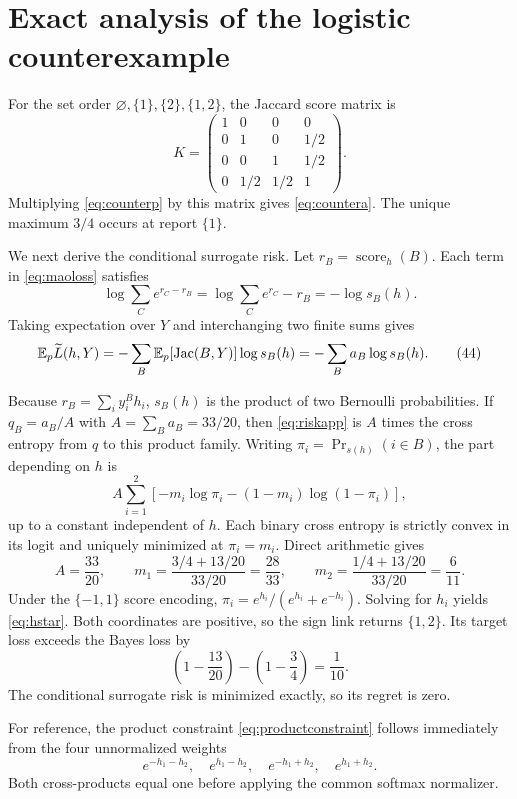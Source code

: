 \section{Exact analysis of the logistic counterexample}
\label{app:counterexample}

For the set order
$\varnothing,\{1\},\{2\},\{1,2\}$, the Jaccard score matrix is
\[
 K=
 \begin{pmatrix}
 1&0&0&0\\
 0&1&0&1/2\\
 0&0&1&1/2\\
 0&1/2&1/2&1
 \end{pmatrix}.
 \tag{42}\label{eq:Ktwo}
\]
Multiplying \eqref{eq:counterp} by this matrix gives
\eqref{eq:countera}. The unique maximum $3/4$ occurs at report $\{1\}$.

We next derive the conditional surrogate risk. Let
$r_B=\operatorname{score}_h(B)$. Each term in \eqref{eq:maoloss} satisfies
\[
 \log\sum_Ce^{r_C-r_B}
 =\log\sum_Ce^{r_C}-r_B=-\log s_B(h).
 \tag{43}\label{eq:logsoftmaxapp}
\]
Taking expectation over $Y$ and interchanging two finite sums gives
\[
 \mathbb E_p\widetilde L(h,Y)
 =-\sum_B\mathbb E_p[\operatorname{Jac}(B,Y)]\log s_B(h)
 =-\sum_Ba_B\log s_B(h).
 \tag{44}\label{eq:riskapp}
\]

Because $r_B=\sum_i y_i^Bh_i$, $s_B(h)$ is the product of two Bernoulli
probabilities. If $q_B=a_B/A$ with $A=\sum_Ba_B=33/20$, then
\eqref{eq:riskapp} is $A$ times the cross entropy from $q$ to this product
family. Writing $\pi_i=\Pr_{s(h)}(i\in B)$, the part depending on $h$ is
\[
 A\sum_{i=1}^2[-m_i\log\pi_i-(1-m_i)\log(1-\pi_i)],
 \tag{45}\label{eq:binaryce}
\]
up to a constant independent of $h$. Each binary cross entropy is strictly
convex in its logit and uniquely minimized at $\pi_i=m_i$. Direct arithmetic
gives
\[
 A=\frac{33}{20},\qquad
 m_1=\frac{3/4+13/20}{33/20}=\frac{28}{33},\qquad
 m_2=\frac{1/4+13/20}{33/20}=\frac6{11}.
 \tag{46}\label{eq:marginalarithmetic}
\]
Under the $\{-1,1\}$ score encoding,
$\pi_i=e^{h_i}/(e^{h_i}+e^{-h_i})$. Solving for $h_i$ yields
\eqref{eq:hstar}. Both coordinates are positive, so the sign link returns
$\{1,2\}$. Its target loss exceeds the Bayes loss by
\[
 \left(1-\frac{13}{20}\right)-\left(1-\frac34\right)=\frac1{10}.
 \tag{47}\label{eq:regretapp}
\]
The conditional surrogate risk is minimized exactly, so its regret is zero.

For reference, the product constraint \eqref{eq:productconstraint} follows
immediately from the four unnormalized weights
\[
 e^{-h_1-h_2},\quad e^{h_1-h_2},\quad
 e^{-h_1+h_2},\quad e^{h_1+h_2}.
\]
Both cross-products equal one before applying the common softmax normalizer.

